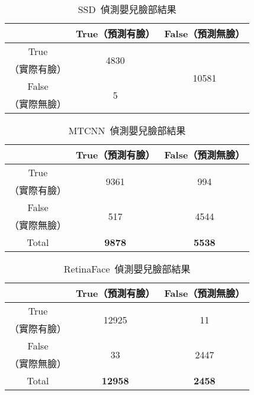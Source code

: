\documentclass[class=NCU_thesis, crop=false]{standalone}
\begin{document}
\begin{table}[h]
    \centering
    \caption{SSD~\cite{ye_face_2021}偵測嬰兒臉部結果}
    \label{table:table-ssd}
    \begin{tabular}{ccc}
    \hline
     & True（預測有臉）& False（預測無臉）\\
    \hline
    True & \multirow{2}{*}{4830} & \multirow{4}{*}{10581} \\
    （實際有臉）& & \\
    False & \multirow{2}{*}{5} & \\
    （實際無臉）&  & \\
    \hline
    \end{tabular}
\end{table}

\begin{table}[h]
    \centering
    \caption{MTCNN~\cite{zhang_joint_2016}偵測嬰兒臉部結果}
    \label{table:table-mtcnn}
    \begin{tabular}{ccc}
    \hline
     & True（預測有臉）& False（預測無臉）\\
    \hline
    True & \multirow{2}{*}{9361} & \multirow{2}{*}{994} \\
    （實際有臉）& & \\
    False & \multirow{2}{*}{517} & \multirow{2}{*}{4544} \\
    （實際無臉）&  & \\
    \hline
    Total & \textbf{9878} & \textbf{5538} \\
    \hline
    \end{tabular}
\end{table}

\begin{table}[h]
    \centering
    \caption{RetinaFace~\cite{deng_retinaface_2020}偵測嬰兒臉部結果}
    \label{table:table-retinaface}
    \begin{tabular}{ccc}
    \hline
     & True（預測有臉）& False（預測無臉）\\
    \hline
    True & \multirow{2}{*}{12925} & \multirow{2}{*}{11} \\
    （實際有臉）& & \\
    False & \multirow{2}{*}{33} & \multirow{2}{*}{2447} \\
    （實際無臉）&  & \\
    \hline
    Total & \textbf{12958} & \textbf{2458} \\
    \hline
    \end{tabular}
\end{table}
\end{document}
